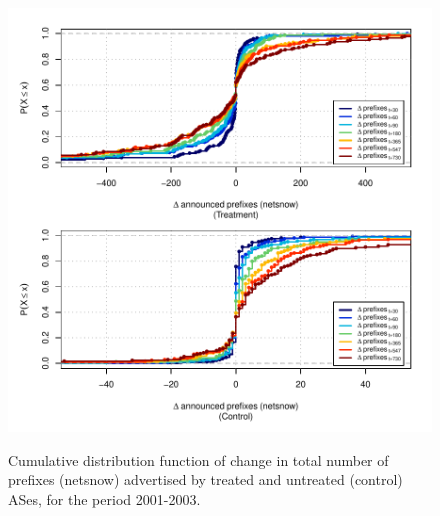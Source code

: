 \clearpage
\vspace*{16pt}
\begin{figure}[H]
\begin{centering}
\begin{singlespace}
\captionsetup{list=no}
    \includegraphics[width=6in]{figures/behavior-netsnow-2001_2003-corr.pdf}
    \vspace{-2em}\\
    \caption{Cumulative distribution function of change in total number of
    prefixes (netsnow) advertised by treated and untreated (control) ASes, for
    the period 2001-2003.}
\end{singlespace}
\end{centering}
\end{figure}

